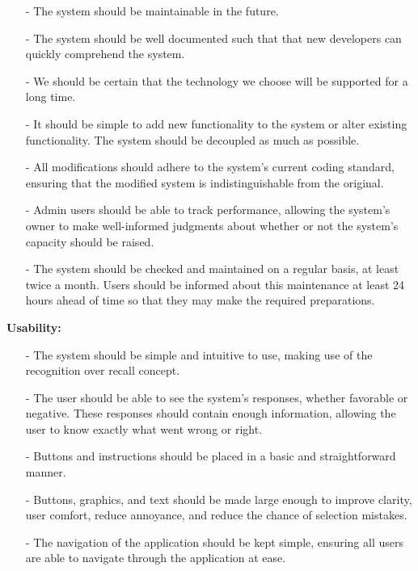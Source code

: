 \documentclass[hidelinks, 12pt, a4paper]{article}
\begin{document}
         \begin{itemize}
            \item[-] The system should be maintainable in the future.
            \item [-] The system should be well documented such that that new developers can quickly comprehend  the system.
            \item[-] We should be certain that the technology we choose will be supported for a long time.
            \item [-] It should be simple to add new functionality to the system or alter existing functionality. The system should be decoupled as much as possible.
            \item[-] All modifications should adhere to the system's current coding standard, ensuring that the modified system is indistinguishable from the original.
            \item [-] Admin users should be able to track performance, allowing the system's owner to make well-informed judgments about whether or not the system's capacity should be raised.
            \item[-] The system should be checked and maintained on a regular basis, at least twice a month. Users should be informed about this maintenance at least 24 hours ahead of time so that they may make the required preparations.


        \end{itemize}
\vspace{0.5cm}    
    \large{ \textbf{Usability:}}
            \begin{itemize}
             \item[-] The system should be simple and intuitive to use, making use of the recognition over recall concept. 
             \item[-]The user should be able to see the system's responses, whether favorable or negative. These responses should contain enough information, allowing the user to know exactly what went wrong or right.
            \item[-] Buttons and instructions should be placed in a basic and straightforward manner.
            \item[-]Buttons, graphics, and text should be made large enough to improve clarity, user comfort, reduce annoyance, and reduce the chance of selection mistakes.
            \item[-]The navigation of the application should be kept simple, ensuring all users are able to navigate through the application at ease.
            
             \end{itemize}
\end{document}
